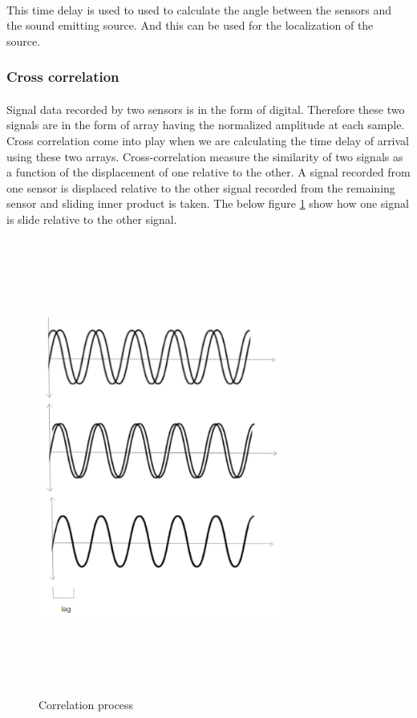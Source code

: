 \documentclass[12pt]{article}
\numberwithin{figure}{section}
\numberwithin{table}{section}
\begin{document}
\paragraph{}
This time delay is used to used to calculate the angle between the sensors and the sound emitting source. And this can be used for the localization of the source. 

\subsubsection{Cross correlation}

\paragraph{}
Signal data recorded by two sensors is in the form of digital. Therefore these two signals are in the form of array having the normalized amplitude at each sample. Cross correlation come into play when we are calculating the time delay of arrival using these two arrays. Cross-correlation measure the similarity of two signals as a function of the displacement of one relative to the other. A signal recorded from one sensor is displaced relative to the other signal recorded from the remaining sensor and sliding inner product is taken. The below figure \ref{crosscor} show how one signal is slide relative to the other signal.

\begin{figure}[H]
\centering
\includegraphics[width=80mm,height=150mm]{crosscor.png}
\caption{Correlation process}
\label{crosscor}
\end{figure}
\end{document}
